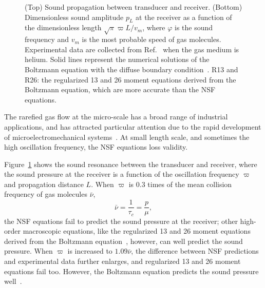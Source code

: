 \begin{figure}[t]
	\caption{ 
		(Top) Sound propagation between transducer and receiver. (Bottom) Dimensionless sound amplitude $p_L$ at the receiver as a function of the dimensionless length $\sqrt\pi\varpi{L}/v_m$, where $\varphi$ is the sound frequency and $v_m$ is the most probable speed of gas molecules. Experimental data are collected from Ref.~\cite{Schotter1974} when the gas medium is helium. Solid lines represent the numerical solutions of the Boltzmann equation with the diffuse boundary condition~\cite{Wu2020AIA}. R13 and R26: the regularized 13 and 26 moment equations derived from the Boltzmann equation, which are more accurate than the NSF equations.
	 } %
	\label{fig:sound}
\end{figure}





The rarefied gas flow at the micro-scale has a broad range of industrial applications, and has attracted particular attention due to the rapid development of microelectromechanical systems~\cite{Beskok_book}. At small length scale, and sometimes the high oscillation frequency, the NSF equations loss validity.


Figure~\ref{fig:sound} shows the sound resonance between the transducer and receiver, where the sound pressure at the receiver is a function of the oscillation frequency $\varpi$ and propagation distance $L$. When $\varpi$ is 0.3 times of the mean collision frequency of gas molecules $\bar{\nu}$,
\begin{equation}\label{chapter1_tau_c}
\bar{\nu}=\frac{1}{\tau_c}=\frac{p}{\mu},
\end{equation}
the NSF equations fail to predict the sound pressure at the receiver; other high-order macroscopic equations, like the regularized 13 and 26 moment equations derived from the Boltzmann equation~\cite{henning,Gu2009JFM}, however, can well predict the sound pressure. When $\varpi$ is increased to $1.09\bar{\nu}$, the difference between NSF predictions and experimental data further enlarges, and regularized 13 and 26 moment equations fail too. However, the Boltzmann equation predicts the sound pressure well~\cite{Wu2020AIA}.


